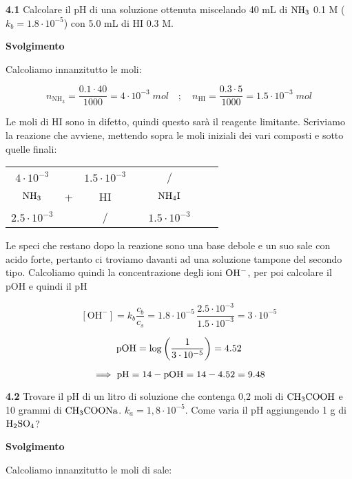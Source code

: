 \textbf{4.1} Calcolare il pH di una soluzione ottenuta miscelando 40 mL di $\rm NH_3$ 0.1 M ($k_b = 1.8 \cdot 10^{-5}$) con 5.0 mL di HI 0.3 M.

\vspace{0.2cm}\large\textbf{Svolgimento}\normalsize

\vspace{0.2cm}Calcoliamo innanzitutto le moli:

$$n_{\text{NH}_3}=\frac{0.1 \cdot 40}{1000}=4 \cdot 10^{-3} \; mol
\quad ; \quad
n_{\text{HI}}=\frac{0.3 \cdot 5}{1000}=1.5 \cdot 10^{-3} \; mol$$

Le moli di HI sono in difetto, quindi questo sarà il reagente limitante. Scriviamo la reazione che avviene, mettendo sopra le moli iniziali dei vari composti e sotto quelle finali:

\begin{center}
    \begin{tabular}{ccccccc}
        $4 \cdot 10^{-3}$ &  & $1.5 \cdot 10^{-3}$ & & /\\
        $\rm NH_3$ & + & HI & \ce{->} & $\rm NH_4I$ \\
        $2.5 \cdot 10^{-3}$ &  &  / & & $1.5 \cdot 10^{-3}$\\
    \end{tabular}
\end{center}

Le speci che restano dopo la reazione sono una base debole e un suo sale con acido forte, pertanto ci troviamo davanti ad una soluzione tampone del secondo tipo. Calcoliamo quindi la concentrazione degli ioni $\rm OH^-$, per poi calcolare il pOH e quindi il pH

$$[\text{OH}^-]=k_b\frac{c_b}{c_s}
=1.8 \cdot 10^{-5}\,\frac{2.5 \cdot 10^{-3}}{1.5 \cdot 10^{-3}}= 3 \cdot 10^{-5}$$

$$\rm pOH=\log\left(\frac{1}{3 \cdot 10^{-5}}\right)=4.52$$

$$\implies \rm pH=14-pOH=14-4.52=9.48$$

\vspace{0.2cm}\textbf{4.2} Trovare il pH di un litro di soluzione che contenga 0,2 moli di $\rm CH_3COOH$ e 10 grammi di $\rm CH_3COONa$. $k_a = 1,8 \cdot 10^{-5}$. Come varia il pH aggiungendo 1 g di $\rm H_2SO_4$?

\vspace{0.2cm}\large\textbf{Svolgimento}\normalsize

\vspace{0.2cm}Calcoliamo innanzitutto le moli di sale:


